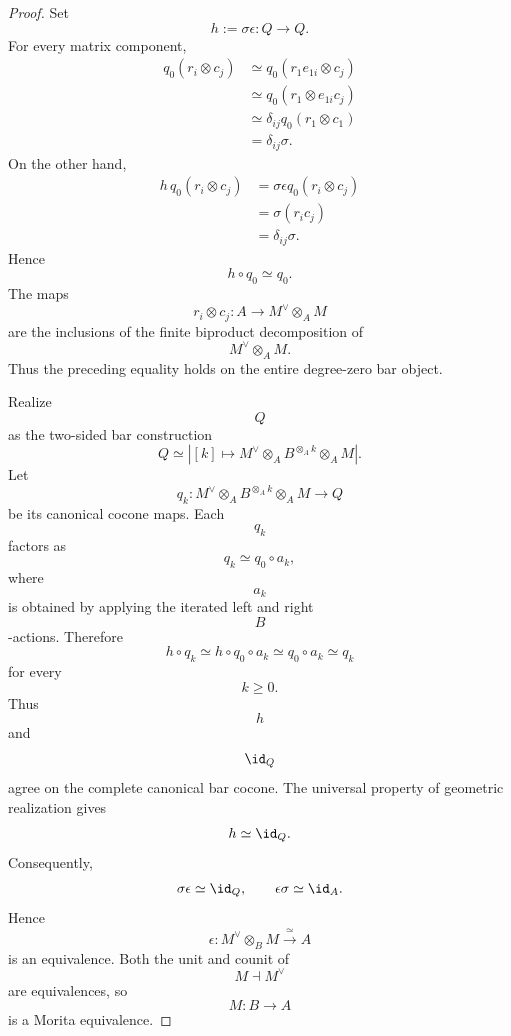 \begin{proof}
Set
\[
    h
    :=
    \sigma\epsilon
    \colon
    Q
    \longrightarrow
    Q.
\]
For every matrix component,
\[
\begin{aligned}
    q_0(r_i\otimes c_j)
    &\simeq
    q_0(r_1e_{1i}\otimes c_j)
    \\
    &\simeq
    q_0(r_1\otimes e_{1i}c_j)
    \\
    &\simeq
    \delta_{ij}
    q_0(r_1\otimes c_1)
    \\
    &=
    \delta_{ij}\sigma.
\end{aligned}
\]
On the other hand,
\[
\begin{aligned}
    h\,q_0(r_i\otimes c_j)
    &=
    \sigma\epsilon q_0(r_i\otimes c_j)
    \\
    &=
    \sigma(r_ic_j)
    \\
    &=
    \delta_{ij}\sigma.
\end{aligned}
\]
Hence
\[
    h\circ q_0
    \simeq
    q_0.
\]
The maps
\[
    r_i\otimes c_j
    \colon
    A
    \longrightarrow
    M^\vee\otimes_AM
\]
are the inclusions of the finite biproduct decomposition of
\[
    M^\vee\otimes_AM.
\]
Thus the preceding equality holds on the entire degree-zero bar object.

Realize
\[
    Q
\]
as the two-sided bar construction
\[
    Q
    \simeq
    \left|
        [k]
        \longmapsto
        M^\vee
        \otimes_A
        B^{\otimes_A k}
        \otimes_A
        M
    \right|.
\]
Let
\[
    q_k
    \colon
    M^\vee
    \otimes_A
    B^{\otimes_A k}
    \otimes_A
    M
    \longrightarrow
    Q
\]
be its canonical cocone maps. Each
\[
    q_k
\]
factors as
\[
    q_k
    \simeq
    q_0\circ a_k,
\]
where
\[
    a_k
\]
is obtained by applying the iterated left and right
\[
    B
\]
-actions. Therefore
\[
    h\circ q_k
    \simeq
    h\circ q_0\circ a_k
    \simeq
    q_0\circ a_k
    \simeq
    q_k
\]
for every
\[
    k\geq0.
\]
Thus
\[
    h
\]
and
\[
    \id_Q
\]
agree on the complete canonical bar cocone. The universal property of
geometric realization gives
\[
    h
    \simeq
    \id_Q.
\]
Consequently,
\[
    \sigma\epsilon
    \simeq
    \id_Q,
    \qquad
    \epsilon\sigma
    \simeq
    \id_A.
\]
Hence
\[
    \epsilon
    \colon
    M^\vee\otimes_BM
    \xrightarrow{\;\simeq\;}
    A
\]
is an equivalence. Both the unit and counit of
\[
    M\dashv M^\vee
\]
are equivalences, so
\[
    M
    \colon
    B
    \longrightarrow
    A
\]
is a Morita equivalence.


\end{proof}

